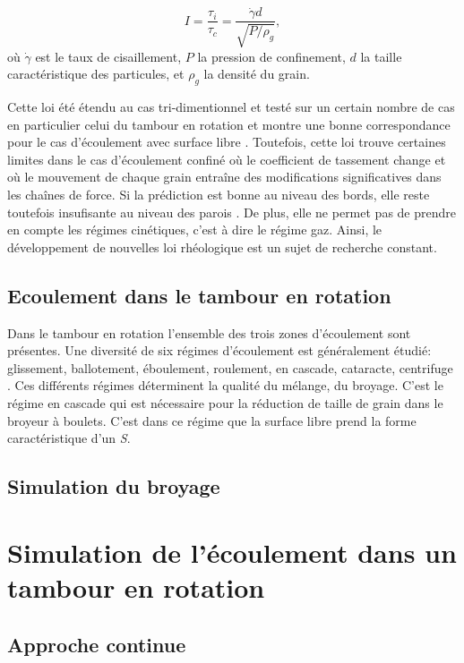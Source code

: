 \begin{equation*}
    I = \frac{\tau_i}{\tau_c} = \frac{\dot \gamma d}{\sqrt{P/\rho_g}},
\end{equation*}où $\dot \gamma$ est le taux de cisaillement, $P$ la pression de confinement, $d$ la taille caractéristique des particules, et $\rho_g$ la densité du grain.

Cette loi été étendu au cas tri-dimentionnel et testé sur un certain nombre de cas en particulier celui du tambour en rotation \cite{Cortet_2009} et montre une bonne correspondance pour le cas d'écoulement avec surface libre \cite{chou_cross-sectional_2009}. Toutefois, cette loi trouve certaines limites dans le cas d'écoulement confiné où le coefficient de tassement change et où le mouvement de chaque grain entraîne des modifications significatives dans les chaînes de force. Si la prédiction est bonne au niveau des bords, elle reste toutefois insufisante au niveau des parois \cite{Rognon_Miller_Metzger_Einav_2015}.
De plus, elle ne permet pas de prendre en compte les régimes cinétiques, c'est à dire le régime gaz. Ainsi, le développement de nouvelles loi rhéologique est un sujet de recherche constant.

\subsection{Ecoulement dans le tambour en rotation}

Dans le tambour en rotation l'ensemble des trois zones d'écoulement sont présentes. Une diversité de six régimes d'écoulement est généralement étudié: glissement, ballotement, éboulement, roulement, en cascade, cataracte,  centrifuge \cite{MELLMANN2001251}.
Ces différents régimes déterminent la qualité du mélange, du broyage.
C'est le régime en cascade qui est nécessaire pour la réduction de taille de grain dans le broyeur à boulets. C'est dans ce régime que la surface libre prend la forme caractéristique d'un \textit{S}.


\subsection{Simulation du broyage}

\section{Simulation de l'écoulement dans un tambour en rotation}

\subsection{Approche continue}

